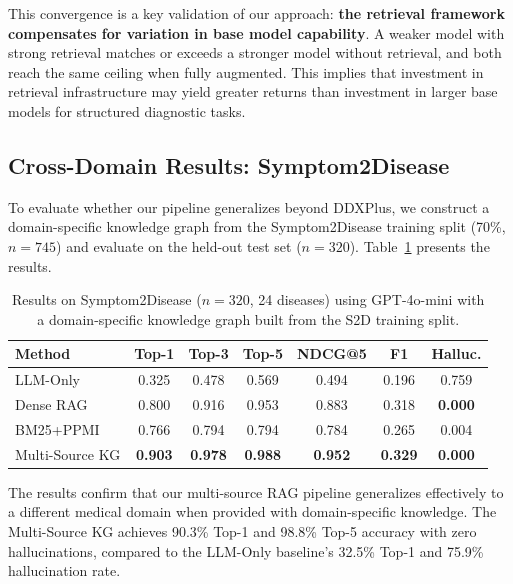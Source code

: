 \documentclass[review]{elsarticle}
\begin{document}
This convergence is a key validation of our approach: \textbf{the retrieval framework compensates for variation in base model capability}. A weaker model with strong retrieval matches or exceeds a stronger model without retrieval, and both reach the same ceiling when fully augmented. This implies that investment in retrieval infrastructure may yield greater returns than investment in larger base models for structured diagnostic tasks.

\subsection{Cross-Domain Results: Symptom2Disease}
\label{sec:cross_domain}

To evaluate whether our pipeline generalizes beyond DDXPlus, we construct a domain-specific knowledge graph from the Symptom2Disease training split (70\%, $n{=}745$) and evaluate on the held-out test set ($n{=}320$). Table~\ref{tab:s2d} presents the results.

\begin{table}[t]
\centering
\caption{Results on Symptom2Disease ($n{=}320$, 24 diseases) using GPT-4o-mini with a domain-specific knowledge graph built from the S2D training split.}
\label{tab:s2d}
\begin{tabular}{lcccccc}
\toprule
\textbf{Method} & \textbf{Top-1} & \textbf{Top-3} & \textbf{Top-5} & \textbf{NDCG@5} & \textbf{F1} & \textbf{Halluc.} \\
\midrule
LLM-Only       & 0.325 & 0.478 & 0.569 & 0.494 & 0.196 & 0.759 \\
Dense RAG       & 0.800 & 0.916 & 0.953 & 0.883 & 0.318 & \textbf{0.000} \\
BM25+PPMI       & 0.766 & 0.794 & 0.794 & 0.784 & 0.265 & 0.004 \\
Multi-Source KG & \textbf{0.903} & \textbf{0.978} & \textbf{0.988} & \textbf{0.952} & \textbf{0.329} & \textbf{0.000} \\
\bottomrule
\end{tabular}
\end{table}

The results confirm that our multi-source RAG pipeline generalizes effectively to a different medical domain when provided with domain-specific knowledge. The Multi-Source KG achieves 90.3\% Top-1 and 98.8\% Top-5 accuracy with zero hallucinations, compared to the LLM-Only baseline's 32.5\% Top-1 and 75.9\% hallucination rate.
\end{document}
